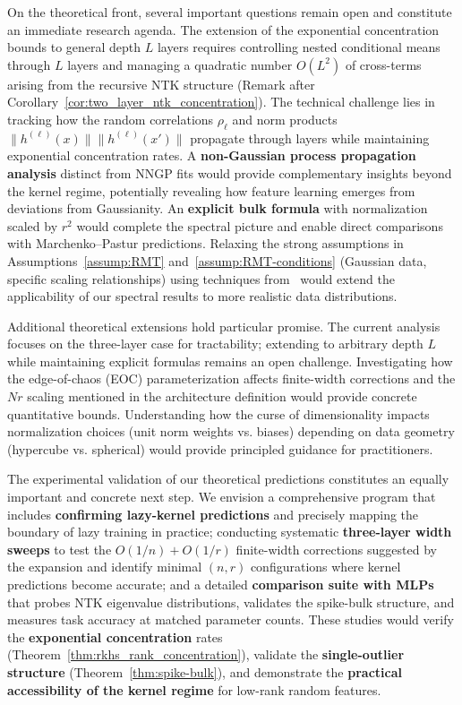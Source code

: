 On the theoretical front, several important questions remain open and constitute an immediate research agenda. The extension of the exponential concentration bounds 
to general depth \( L \) layers requires controlling nested conditional means through \( L \) layers and managing a quadratic number \( O(L^2) \) of cross-terms arising
 from the recursive NTK structure (Remark after Corollary~\ref{cor:two_layer_ntk_concentration}). The technical challenge lies in tracking how the random correlations 
 \( \rho_\ell \) and norm products \( \|h^{(\ell)}(x)\|\|h^{(\ell)}(x')\| \) propagate through layers while maintaining exponential concentration rates. 
 A \textbf{non-Gaussian process propagation analysis} distinct from NNGP fits would provide complementary insights beyond the kernel regime, potentially revealing 
 how feature learning emerges from deviations from Gaussianity. An \textbf{explicit bulk formula} with normalization scaled by \textbf{\( r^2 \)} would complete the 
 spectral picture and enable direct comparisons with Marchenko–Pastur predictions. Relaxing the strong assumptions in Assumptions~\ref{assump:RMT}
  and~\ref{assump:RMT-conditions} (Gaussian data, specific scaling relationships) using techniques from~\cite{benigni2025eigenvaluedistributionneuraltangent}
   would extend the applicability of our spectral results to more realistic data distributions.

Additional theoretical extensions hold particular promise. The current analysis focuses on the three-layer case for tractability; extending to arbitrary depth \( L \) 
while maintaining explicit formulas remains an open challenge. Investigating how the edge-of-chaos (EOC) parameterization affects finite-width corrections and the \( Nr \) scaling mentioned in the architecture definition would provide concrete quantitative bounds. Understanding how the curse of dimensionality impacts normalization choices (unit norm weights vs. biases) depending on data geometry (hypercube vs. spherical) would provide principled guidance for practitioners.

The experimental validation of our theoretical predictions constitutes an equally important and concrete next step. We envision a comprehensive program that
 includes \textbf{confirming lazy-kernel predictions} and precisely mapping the boundary of lazy training in practice; conducting systematic
  \textbf{three-layer width sweeps} to test the \( O(1/n)+O(1/r) \) finite-width corrections suggested by the expansion and identify minimal \( (n,r) \)
   configurations where kernel predictions become accurate; and a detailed \textbf{comparison suite with MLPs} that probes NTK eigenvalue distributions, 
   validates the spike-bulk structure, and measures task accuracy at matched parameter counts. These studies would verify the \textbf{exponential concentration}
    rates (Theorem~\ref{thm:rkhs_rank_concentration}), validate the \textbf{single-outlier structure} (Theorem~\ref{thm:spike-bulk}), and demonstrate the 
    \textbf{practical accessibility of the kernel regime} for low-rank random features.

